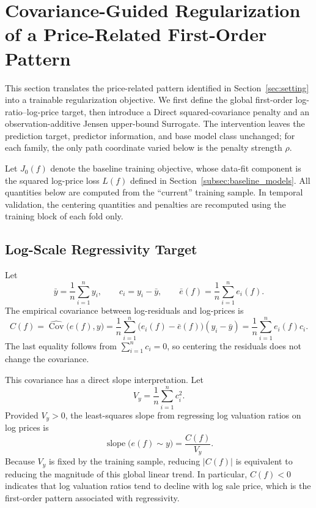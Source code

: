 \documentclass[10pt]{article}
\theoremstyle{definition}
\newcommand{\1}{\mathbf{1}}
\begin{document}
\section{Covariance-Guided Regularization of a Price-Related First-Order Pattern}
\label{sec:method}


{This section translates the price-related pattern identified in Section~\ref{sec:setting} into a trainable regularization objective. We first define the global first-order log-ratio--log-price target, then introduce a Direct squared-covariance penalty and an observation-additive Jensen upper-bound Surrogate. The intervention leaves the prediction target, predictor information, and base model class unchanged; for each family, the only path coordinate varied below is the penalty strength $\rho$.}

{Let $J_0(f)$ denote the baseline training objective, whose data-fit component is the squared log-price loss $L(f)$ defined in Section~\ref{subsec:baseline_models}. All quantities below are computed from the ``current'' training sample. In temporal validation, the centering quantities and penalties are recomputed using the training block of each fold only.}


\subsection{Log-Scale Regressivity Target}
\label{subsec:training_regressivity}

Let
\begin{equation}
\label{eq:centered_log_price}
\bar y=\frac{1}{n}\sum_{i=1}^n y_i,
\qquad
c_i=y_i-\bar y,
\qquad
\bar e(f)=\frac{1}{n}\sum_{i=1}^n e_i(f).
\end{equation}
The empirical covariance between log-residuals and log-prices is
\begin{equation}
\label{eq:training_covariance}
C(f)
=
\widehat{\operatorname{Cov}}\bigl(e(f),y\bigr)
=
\frac{1}{n}\sum_{i=1}^n
\bigl(e_i(f)-\bar e(f)\bigr)(y_i-\bar y)
=
\frac{1}{n}\sum_{i=1}^n e_i(f)c_i.
\end{equation}
The last equality follows from $\sum_{i=1}^n c_i=0$, so centering the residuals does not change the covariance.

This covariance has a direct slope interpretation. Let
\[
V_y=\frac{1}{n}\sum_{i=1}^n c_i^2.
\]
Provided $V_y>0$, the least-squares slope from regressing log valuation ratios on log prices is
\begin{equation}
\label{eq:covariance_slope}
\operatorname{slope}\bigl(e(f)\sim y\bigr)
=
\frac{C(f)}{V_y}.
\end{equation}
Because $V_y$ is fixed by the training sample, reducing $|C(f)|$ is equivalent to reducing the magnitude of this global linear trend. In particular, $C(f)<0$ indicates that log valuation ratios tend to decline with log sale price, which is the first-order pattern associated with regressivity.
\end{document}
